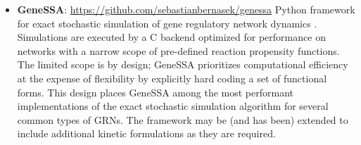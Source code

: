 \begin{itemize}[leftmargin=*,topsep=10pt, itemsep=10pt]
  \item \textbf{GeneSSA}: \url{https://github.com/sebastianbernasek/genessa}
  \newline
  Python framework for exact stochastic simulation of gene regulatory network dynamics \cite{Gillespie1977}. Simulations are executed by a C backend optimized for performance on networks with a narrow scope of pre-defined reaction propensity functions. The limited scope is by design; GeneSSA prioritizes computational efficiency at the expense of flexibility by explicitly hard coding a set of functional forms. This design places GeneSSA among the most performant implementations of the exact stochastic simulation algorithm for several common types of GRNs. The framework may be (and has been) extended to include additional kinetic formulations as they are required.
  
\end{itemize}
